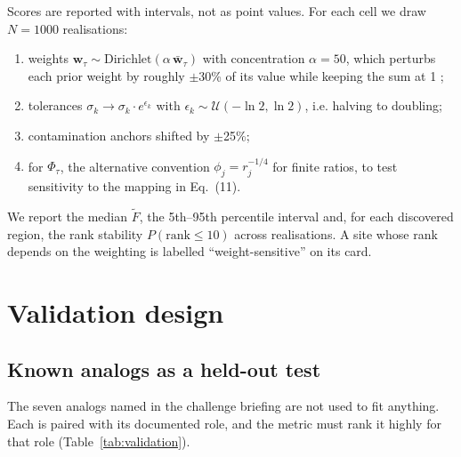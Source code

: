 \documentclass[11pt,a4paper]{article}
\begin{document}
Scores are reported with intervals, not as point values. For each cell we draw $N=1000$ realisations:
\begin{enumerate}
\item weights $\mathbf{w}_\tau\sim\mathrm{Dirichlet}(\alpha\,\bar{\mathbf{w}}_\tau)$ with concentration $\alpha=50$, which perturbs each prior weight by roughly $\pm$30\% of its value while keeping the sum at 1 \citep{butler1997};
\item tolerances $\sigma_k\to\sigma_k\cdot e^{\epsilon_k}$ with $\epsilon_k\sim\mathcal{U}(-\ln 2,\ln 2)$, i.e. halving to doubling;
\item contamination anchors shifted by $\pm$25\%;
\item for $\Phi_\tau$, the alternative convention $\phi_j=r_j^{-1/4}$ for finite ratios, to test sensitivity to the mapping in Eq.~(11).
\end{enumerate}
We report the median $\tilde F$, the 5th--95th percentile interval and, for each discovered region, the rank stability $P(\text{rank}\le 10)$ across realisations. A site whose rank depends on the weighting is labelled ``weight-sensitive'' on its card.

\section{Validation design}

\subsection{Known analogs as a held-out test}
The seven analogs named in the challenge briefing are not used to fit anything. Each is paired with its documented role, and the metric must rank it highly for that role (Table~\ref{tab:validation}).
\end{document}
